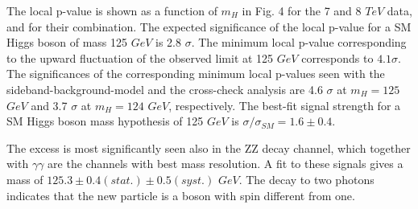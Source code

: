 \documentclass[a0paper,portrait]{baposter}
\begin{document}
\begin{poster}
{The local p-value is shown as a function of $m_H$ in Fig. 4 for the 7 and 8 $TeV$ data, 
and for their combination. The expected significance of the local p-value for a SM Higgs boson of mass
125 $GeV$ is 2.8 $\sigma$. The minimum local p-value corresponding to the upward fluctuation of the observed limit
at 125 $GeV$ corresponds to $4.1 \sigma$. The significances of the corresponding minimum local p-values seen with 
the sideband-background-model and the cross-check analysis are 4.6 $\sigma$ at $m_H=125$ $GeV$ and 3.7 $\sigma$ 
at $m_H=124$ $GeV$, respectively. The best-fit signal strength for a SM Higgs boson mass hypothesis of 125 
$GeV$ is $\sigma/\sigma_{SM}=1.6 \pm 0.4$.

The excess is most significantly seen also in the ZZ decay channel, which together with $\gamma\gamma$ are the 
channels with best mass 
resolution. A fit to these signals gives a mass of $125.3 \pm 0.4 (stat.) \pm 0.5 (syst.)$ $GeV$. The decay to 
two photons indicates that the new particle is a boson with spin different from one.

}


\end{poster}
\end{document}
